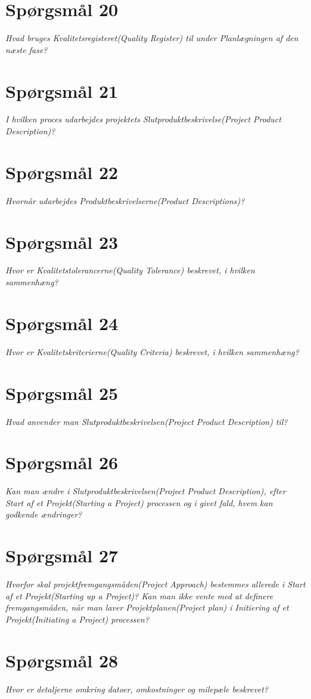 \section{Spørgsmål 20}
\textit{Hvad bruges Kvalitetsregisteret(Quality Register) til under Planlægningen af den næste fase?}
\section{Spørgsmål 21}
\textit{I hvilken proces udarbejdes projektets Slutproduktbeskrivelse(Project Product Description)?}
\section{Spørgsmål 22}
\textit{Hvornår udarbejdes Produktbeskrivelserne(Product Descriptions)?}
\section{Spørgsmål 23}
\textit{Hvor er Kvalitetstolerancerne(Quality Tolerance) beskrevet, i hvilken sammenhæng?}
\section{Spørgsmål 24}
\textit{Hvor er Kvalitetskriterierne(Quality Criteria) beskrevet, i hvilken sammenhæng?}
\section{Spørgsmål 25}
\textit{Hvad anvender man Slutproduktbeskrivelsen(Project Product Description) til?}
\section{Spørgsmål 26}
\textit{Kan man ændre i Slutproduktbeskrivelsen(Project Product Description), efter Start af et Projekt(Starting a Project) processen og i givet fald, hvem kan godkende ændringer?}
\section{Spørgsmål 27}
\textit{Hvorfor skal projektfremgangsmåden(Project Approach) bestemmes allerede i Start af et Projekt(Starting up a Project)? Kan man ikke vente med at definere fremgangsmåden, når man laver Projektplanen(Project plan) i Initiering af et Projekt(Initiating a Project) processen?}
\section{Spørgsmål 28}
\textit{Hvor er detaljerne omkring datoer, omkostninger og milepæle beskrevet?}
